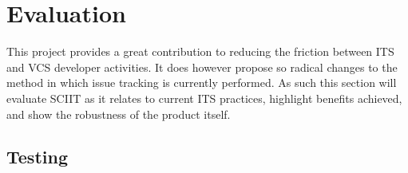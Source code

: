 \documentclass{mproj}
\begin{document}
\chapter{Evaluation}\label{evaluation}

This project provides a great contribution to reducing the friction between ITS and VCS developer activities. It does however propose so radical changes to the method in which issue tracking is currently performed. As such this section will evaluate SCIIT as it relates to current ITS practices, highlight benefits achieved, and show the robustness of the product itself.






\section{Testing} %
\end{document}
